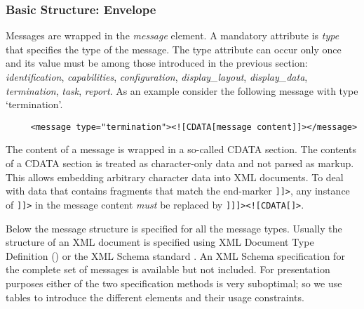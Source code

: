 \documentclass{article}
\begin{document}
   \subsubsection{Basic Structure: Envelope} \label{ss:structure}

    \noindent Messages are wrapped in the \textit{message} element. A mandatory
    attribute is \textit{type} that specifies the type of the message. The type
    attribute can occur only once and its value must be among those introduced
    in the previous section: \textit{identification}, \textit{capabilities},
    \textit{configuration}, \textit{display\_layout}, \textit{display\_data},
    \textit{termination}, \textit{task},
    \textit{report}. As an example consider the following message with type
    `termination'.

    \begin{verbatim}
     <message type="termination"><![CDATA[message content]]></message>\end{verbatim}

    \noindent The content of a message is wrapped in a so-called CDATA section. The
    contents of a CDATA section is treated as character-only data and not
    parsed as markup. This allows embedding arbitrary character data into XML
    documents. To deal with data that contains fragments that match the
    end-marker \verb']]>', any instance of \verb']]>' in the message content
    \textit{must} be replaced by \verb']]]><![CDATA[]>'.

    \noindent Below the message structure is specified for all the message
    types. Usually the structure of an XML document is specified using XML
    Document Type Definition (\cite{Sperberg-McQueen:06:EML}) or the XML Schema
    standard \cite{Malhotra:06:XSP}. An XML Schema specification for the
    complete set of messages is available but not included. For presentation
    purposes either of the two specification methods is very suboptimal; so we
    use tables to introduce the different elements and their usage constraints.


\end{document}
